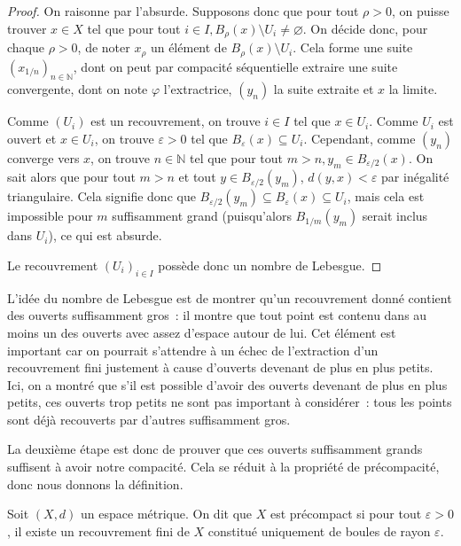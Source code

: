 \begin{proof}
  On raisonne par l'absurde. Supposons donc que pour tout $\rho > 0$, on puisse
  trouver $x \in X$ tel que pour tout
  $i \in I, B_\rho(x) \setminus U_i \neq \varnothing$. On décide donc, pour
  chaque $\rho > 0$, de noter $x_\rho$ un élément de $B_\rho(x) \setminus U_i$.
  Cela forme une suite $(x_{1/n})_{n\in \mathbb N}$, dont on peut par compacité
  séquentielle extraire une suite convergente, dont on note $\varphi$
  l'extractrice, $(y_n)$ la suite extraite et $x$ la limite.

  Comme $(U_i)$ est un recouvrement, on trouve $i\in I$ tel que $x \in U_i$.
  Comme $U_i$ est ouvert et $x\in U_i$, on trouve $\varepsilon > 0$ tel que
  $B_\varepsilon(x) \subseteq U_i$. Cependant, comme $(y_n)$ converge vers $x$,
  on trouve $n\in \mathbb N$ tel que pour tout
  $m > n, y_m\in B_{\varepsilon/2}(x)$. On sait alors que pour tout $m > n$ et
  tout $y\in B_{\varepsilon/2}(y_m)$, $d(y,x) < \varepsilon$ par inégalité
  triangulaire. Cela signifie donc que
  $B_{\varepsilon/2}(y_m)\subseteq B_\varepsilon(x)\subseteq U_i$, mais cela
  est impossible pour $m$ suffisamment grand (puisqu'alors $B_{1/m}(y_m)$ serait
  inclus dans $U_i$), ce qui est absurde.

  Le recouvrement $(U_i)_{i\in I}$ possède donc un nombre de Lebesgue.
\end{proof}

L'idée du nombre de Lebesgue est de montrer qu'un recouvrement donné contient
des ouverts suffisamment gros~: il montre que tout point est contenu dans au
moins un des ouverts avec assez d'espace autour de lui. Cet élément est
important car on pourrait s'attendre à un échec de l'extraction d'un
recouvrement fini justement à cause d'ouverts devenant de plus en plus petits.
Ici, on a montré que s'il est possible d'avoir des ouverts devenant de plus en
plus petits, ces ouverts trop petits ne sont pas important à considérer~: tous
les points sont déjà recouverts par d'autres suffisamment gros.

La deuxième étape est donc de prouver que ces ouverts suffisamment grands
suffisent à avoir notre compacité. Cela se réduit à la propriété de
précompacité, donc nous donnons la définition.

\begin{definition}[Précompacité]
  Soit $(X,d)$ un espace métrique. On dit que $X$ est précompact si pour tout
  $\varepsilon > 0$, il existe un recouvrement fini de $X$ constitué
  uniquement de boules de rayon $\varepsilon$.
\end{definition}

